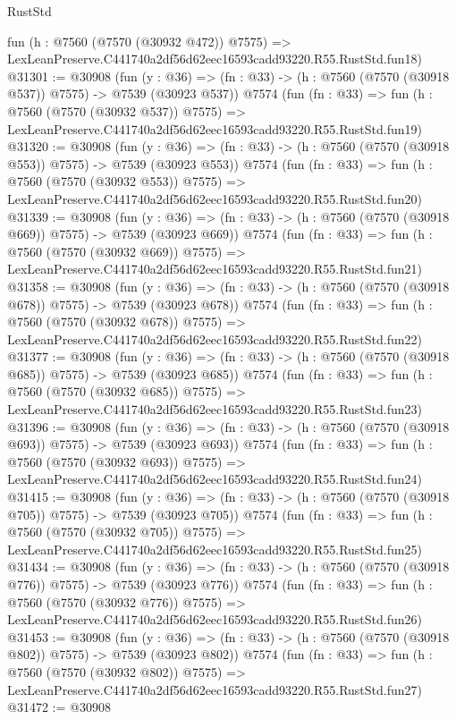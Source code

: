 \begin{lexlean}{RustStd}
\begin{coremodule}
    fun (h : @7560 (@7570 (@30932 @472)) @7575) =>
    LexLeanPreserve.C441740a2df56d62eec16593cadd93220.R55.RustStd.fun18)
@31301 := @30908
    (fun (y : @36) => (fn : @33) -> (h : @7560 (@7570 (@30918 @537)) @7575) -> @7539 (@30923 @537))
    @7574
    (fun (fn : @33) =>
    fun (h : @7560 (@7570 (@30932 @537)) @7575) =>
    LexLeanPreserve.C441740a2df56d62eec16593cadd93220.R55.RustStd.fun19)
@31320 := @30908
    (fun (y : @36) => (fn : @33) -> (h : @7560 (@7570 (@30918 @553)) @7575) -> @7539 (@30923 @553))
    @7574
    (fun (fn : @33) =>
    fun (h : @7560 (@7570 (@30932 @553)) @7575) =>
    LexLeanPreserve.C441740a2df56d62eec16593cadd93220.R55.RustStd.fun20)
@31339 := @30908
    (fun (y : @36) => (fn : @33) -> (h : @7560 (@7570 (@30918 @669)) @7575) -> @7539 (@30923 @669))
    @7574
    (fun (fn : @33) =>
    fun (h : @7560 (@7570 (@30932 @669)) @7575) =>
    LexLeanPreserve.C441740a2df56d62eec16593cadd93220.R55.RustStd.fun21)
@31358 := @30908
    (fun (y : @36) => (fn : @33) -> (h : @7560 (@7570 (@30918 @678)) @7575) -> @7539 (@30923 @678))
    @7574
    (fun (fn : @33) =>
    fun (h : @7560 (@7570 (@30932 @678)) @7575) =>
    LexLeanPreserve.C441740a2df56d62eec16593cadd93220.R55.RustStd.fun22)
@31377 := @30908
    (fun (y : @36) => (fn : @33) -> (h : @7560 (@7570 (@30918 @685)) @7575) -> @7539 (@30923 @685))
    @7574
    (fun (fn : @33) =>
    fun (h : @7560 (@7570 (@30932 @685)) @7575) =>
    LexLeanPreserve.C441740a2df56d62eec16593cadd93220.R55.RustStd.fun23)
@31396 := @30908
    (fun (y : @36) => (fn : @33) -> (h : @7560 (@7570 (@30918 @693)) @7575) -> @7539 (@30923 @693))
    @7574
    (fun (fn : @33) =>
    fun (h : @7560 (@7570 (@30932 @693)) @7575) =>
    LexLeanPreserve.C441740a2df56d62eec16593cadd93220.R55.RustStd.fun24)
@31415 := @30908
    (fun (y : @36) => (fn : @33) -> (h : @7560 (@7570 (@30918 @705)) @7575) -> @7539 (@30923 @705))
    @7574
    (fun (fn : @33) =>
    fun (h : @7560 (@7570 (@30932 @705)) @7575) =>
    LexLeanPreserve.C441740a2df56d62eec16593cadd93220.R55.RustStd.fun25)
@31434 := @30908
    (fun (y : @36) => (fn : @33) -> (h : @7560 (@7570 (@30918 @776)) @7575) -> @7539 (@30923 @776))
    @7574
    (fun (fn : @33) =>
    fun (h : @7560 (@7570 (@30932 @776)) @7575) =>
    LexLeanPreserve.C441740a2df56d62eec16593cadd93220.R55.RustStd.fun26)
@31453 := @30908
    (fun (y : @36) => (fn : @33) -> (h : @7560 (@7570 (@30918 @802)) @7575) -> @7539 (@30923 @802))
    @7574
    (fun (fn : @33) =>
    fun (h : @7560 (@7570 (@30932 @802)) @7575) =>
    LexLeanPreserve.C441740a2df56d62eec16593cadd93220.R55.RustStd.fun27)
@31472 := @30908

\end{coremodule}
\end{lexlean}
